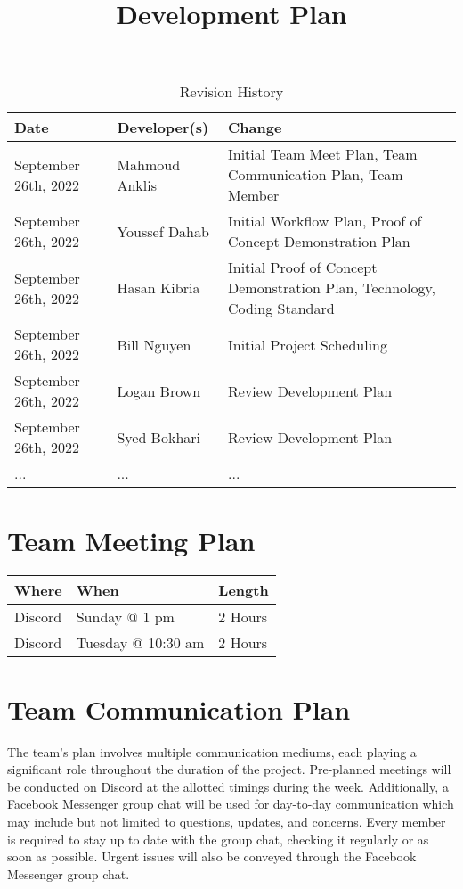 \documentclass[12pt,letterpaper]{article}
\title{Development Plan\\\progname}
\author{\authname}
\date{}
\begin{document}
\maketitle

\begin{table}[hp]
	\caption{Revision History} \label{TblRevisionHistory}
	\begin{tabularx}{\textwidth}{llX}
		\toprule
		\textbf{Date} & \textbf{Developer(s)} & \textbf{Change}\\
		\midrule
		September 26th, 2022 & Mahmoud Anklis  & Initial Team Meet Plan, Team Communication Plan, Team Member\\
		September 26th, 2022 & Youssef Dahab  & Initial Workflow Plan, Proof of Concept Demonstration Plan \\
		September 26th, 2022 & Hasan Kibria  & Initial Proof of Concept Demonstration Plan, Technology, Coding Standard \\
		September 26th, 2022 & Bill Nguyen  & Initial Project Scheduling \\
		September 26th, 2022 & Logan Brown & Review Development Plan\\
		September 26th, 2022 & Syed Bokhari & Review Development Plan\\
		... & ... & ...\\
		\bottomrule
	\end{tabularx}
\end{table}

\newpage

\section{Team Meeting Plan}
\begin{table}[hp]
\begin{tabularx}{\textwidth}{|l|l|X|}
\toprule
\textbf{Where} & \textbf{When} & \textbf{Length}\\
\midrule
Discord & Sunday @ 1 pm & 2 Hours\\
Discord & Tuesday @ 10:30 am & 2 Hours\\
\bottomrule
\end{tabularx}
\end{table}

\section{Team Communication Plan}
The team’s plan involves multiple communication mediums, each playing a significant role throughout the duration of the project. Pre-planned meetings will be conducted on Discord at the allotted timings during the week. Additionally, a Facebook Messenger group chat will be used for day-to-day communication which may include but not limited to questions, updates, and concerns. Every member is required to stay up to date with the group chat, checking it regularly or as soon as possible. Urgent issues will also be conveyed through the Facebook Messenger group chat. 
\end{document}
